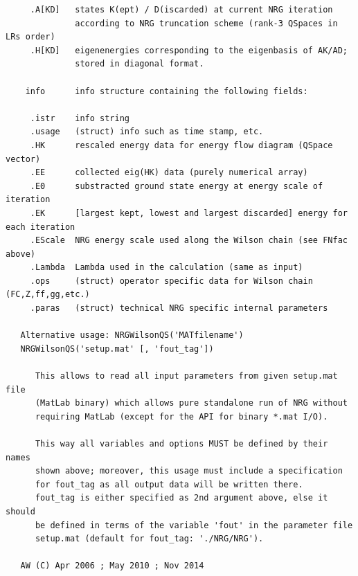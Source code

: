 \documentclass[twoside,12pt]{article}
\begin{document}
\begin{verbatim}
     .A[KD]   states K(ept) / D(iscarded) at current NRG iteration
              according to NRG truncation scheme (rank-3 QSpaces in LRs order)
     .H[KD]   eigenenergies corresponding to the eigenbasis of AK/AD;
              stored in diagonal format.
 
    info      info structure containing the following fields:
 
     .istr    info string
     .usage   (struct) info such as time stamp, etc.
     .HK      rescaled energy data for energy flow diagram (QSpace vector)
     .EE      collected eig(HK) data (purely numerical array)
     .E0      substracted ground state energy at energy scale of iteration
     .EK      [largest kept, lowest and largest discarded] energy for each iteration
     .EScale  NRG energy scale used along the Wilson chain (see FNfac above)
     .Lambda  Lambda used in the calculation (same as input)
     .ops     (struct) operator specific data for Wilson chain (FC,Z,ff,gg,etc.)
     .paras   (struct) technical NRG specific internal parameters
 
   Alternative usage: NRGWilsonQS('MATfilename')
   NRGWilsonQS('setup.mat' [, 'fout_tag'])
 
      This allows to read all input parameters from given setup.mat file
      (MatLab binary) which allows pure standalone run of NRG without
      requiring MatLab (except for the API for binary *.mat I/O).
 
      This way all variables and options MUST be defined by their names
      shown above; moreover, this usage must include a specification
      for fout_tag as all output data will be written there.
      fout_tag is either specified as 2nd argument above, else it should
      be defined in terms of the variable 'fout' in the parameter file
      setup.mat (default for fout_tag: './NRG/NRG').
 
   AW (C) Apr 2006 ; May 2010 ; Nov 2014
\end{verbatim}

\pagebreak[3]


\end{document}
